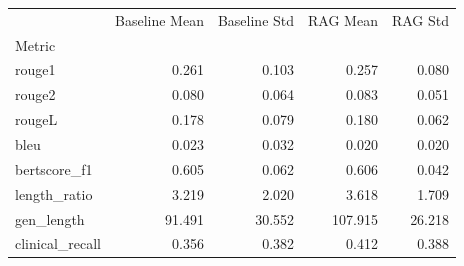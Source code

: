 \begin{tabular}{lrrrr}
\toprule
 & Baseline Mean & Baseline Std & RAG Mean & RAG Std \\
Metric &  &  &  &  \\
\midrule
rouge1 & 0.261 & 0.103 & 0.257 & 0.080 \\
rouge2 & 0.080 & 0.064 & 0.083 & 0.051 \\
rougeL & 0.178 & 0.079 & 0.180 & 0.062 \\
bleu & 0.023 & 0.032 & 0.020 & 0.020 \\
bertscore_f1 & 0.605 & 0.062 & 0.606 & 0.042 \\
length_ratio & 3.219 & 2.020 & 3.618 & 1.709 \\
gen_length & 91.491 & 30.552 & 107.915 & 26.218 \\
clinical_recall & 0.356 & 0.382 & 0.412 & 0.388 \\
\bottomrule
\end{tabular}
